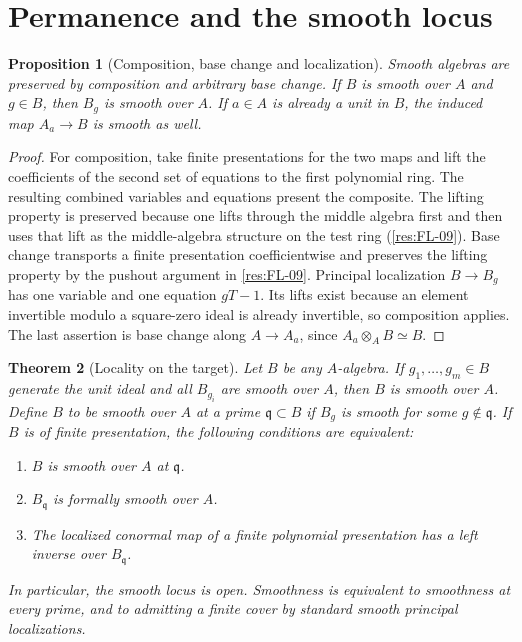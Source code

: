 \documentclass[11pt,oneside,openany]{book}
\newtheorem{theorem}{Theorem}[chapter]
\newtheorem{proposition}[theorem]{Proposition}
\theoremstyle{definition}
\theoremstyle{remark}
\begin{document}
\section{Permanence and the smooth locus}

\begin{proposition}[Composition, base change and localization]
\label{res:SM-06}
Smooth algebras are preserved by composition and arbitrary base
change. If $B$ is smooth over $A$ and $g\in B$, then $B_g$
is smooth over $A$. If $a\in A$ is already a unit in $B$, the
induced map $A_a\to B$ is smooth as well.
\end{proposition}

\begin{proof}
For composition, take finite presentations for the two maps and
lift the coefficients of the second set of equations to the first
polynomial ring. The resulting combined variables and equations
present the composite. The lifting property is preserved because
one lifts through the middle algebra first and then uses that lift
as the middle-algebra structure on the test ring
(\ref{res:FL-09}). Base change transports a finite presentation
coefficientwise and preserves the lifting property by the
pushout argument in \ref{res:FL-09}. Principal localization
$B\to B_g$ has one variable and one equation $gT-1$. Its lifts
exist because an element invertible modulo a square-zero ideal
is already invertible, so composition applies. The last assertion
is base change along $A\to A_a$, since $A_a\otimes_A B\simeq B$.
\end{proof}

\begin{theorem}[Locality on the target]
\label{res:SM-07}
Let $B$ be any $A$-algebra. If $g_1,\ldots,g_m\in B$ generate the
unit ideal and all $B_{g_i}$ are smooth over $A$, then $B$ is smooth
over $A$. Define $B$ to be smooth over $A$ at a prime
$\mathfrak q\subset B$ if $B_g$ is smooth for some
$g\notin\mathfrak q$. If $B$ is of finite presentation, the
following conditions are equivalent:
\begin{enumerate}
\item $B$ is smooth over $A$ at $\mathfrak q$.
\item $B_{\mathfrak q}$ is formally smooth over $A$.
\item The localized conormal map of a finite polynomial
  presentation has a left inverse over $B_{\mathfrak q}$.
\end{enumerate}
In particular, the smooth locus is open. Smoothness is equivalent
to smoothness at every prime, and to admitting a finite cover by
standard smooth principal localizations.
\end{theorem}
\end{document}
